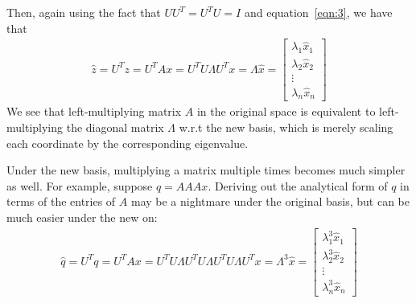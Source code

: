 \documentclass[12pt]{article}
\begin{document}
Then, again using the fact that $UU^T = U^TU = I$ and equation~\eqref{eqn:3},  we have that 
\begin{align}
\hat{z} = U^T z = U^T Ax = U^T U\Lambda U^T x = \Lambda \hat{x}  = \left [ \begin{array}{c} \lambda_1 \hat{x}_1 \\ \lambda_2 \hat{x}_2 \\ \vdots \\ \lambda_n \hat{x}_n  \end{array} \right ]\nonumber
\end{align}
We see that left-multiplying matrix $A$ in the original space is equivalent to left-multiplying the diagonal matrix $\Lambda$ w.r.t the new basis, which is merely scaling each coordinate by the corresponding eigenvalue. %

Under the new basis, multiplying a matrix multiple times becomes much simpler as well. For example, suppose $q = AAAx$. Deriving out the analytical form of $q$ in terms of the entries of $A$ may be a nightmare under the original basis, but can be much easier under the new on: 
\begin{align}
\hat{q} = U^T q = U^TAx = U^TU\Lambda U^TU\Lambda U^TU\Lambda U^Tx = \Lambda^3 \hat{x} = \left [ \begin{array}{c} \lambda_1^3 \hat{x}_1 \\ \lambda_2^3 \hat{x}_2 \\ \vdots \\ \lambda_n^3 \hat{x}_n  \end{array} \right ]
\end{align}











%
\end{document}
